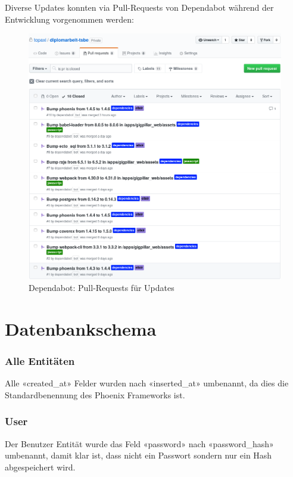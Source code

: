 \clearpage
Diverse Updates konnten via Pull-Requests von Dependabot während der Entwicklung
vorgenommen werden:

\begin{figure}[!htb]
  \centering
  \includegraphics[width=1\textwidth]{realisierung/dependabot-updates-cropped.png}
  \caption{Dependabot: Pull-Requests für Updates}
\end{figure}

\clearpage
\section{Datenbankschema}\label{RealisierungsSchema}

\subsubsection{Alle Entitäten}
Alle «created\_at» Felder wurden nach «inserted\_at» umbenannt, da dies die
Standardbenennung des Phoenix Frameworks ist.

\subsubsection{User}
Der Benutzer Entität wurde das Feld «password» nach «password\_hash» umbenannt,
damit klar ist, dass nicht ein Passwort sondern nur ein Hash abgespeichert wird.

